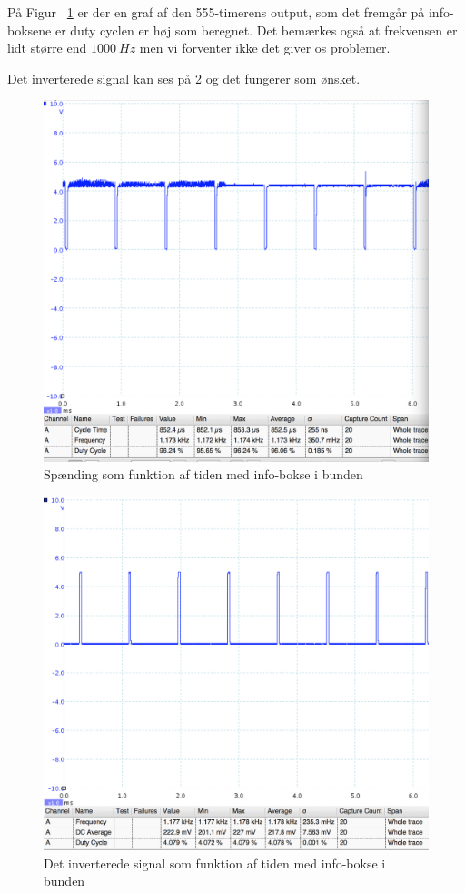 På Figur ~\ref{fig:555noninv} er der en graf af den 555-timerens output, som det fremgår på info-boksene er duty cyclen er høj som beregnet. Det bemærkes også at frekvensen er lidt større end $\SI{1000}{Hz}$ men vi forventer ikke det giver os problemer.

Det inverterede signal kan ses på \ref{fig:555inv} og det fungerer som ønsket.
\begin{figure}[H]
	\centering
    \includegraphics[width=13cm]{figures/2_4_3hastighed/555signal.png}
	\caption{Spænding som funktion af tiden med info-bokse i bunden}
	\label{fig:555noninv}
\end{figure}

\begin{figure}[H]
	\centering
    \includegraphics[width=13cm]{figures/2_4_3hastighed/555signalinv.png}
	\caption{Det inverterede signal som funktion af tiden med info-bokse i bunden}
	\label{fig:555inv}
\end{figure}

